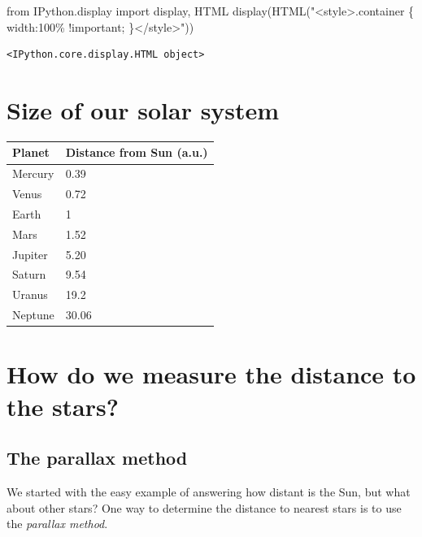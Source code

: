 \documentclass[
  letterpaper,
  DIV=11,
  numbers=noendperiod]{scrreprt}
\newenvironment{Shaded}{\begin{snugshade}}{\end{snugshade}}
\newcommand{\ImportTok}[1]{\textcolor[rgb]{0.00,0.46,0.62}{#1}}
\newcommand{\NormalTok}[1]{\textcolor[rgb]{0.00,0.23,0.31}{#1}}
\newcommand{\StringTok}[1]{\textcolor[rgb]{0.13,0.47,0.30}{#1}}
\begin{document}
\begin{Shaded}
\begin{Highlighting}[]
\ImportTok{from}\NormalTok{ IPython.display }\ImportTok{import}\NormalTok{ display, HTML}
\NormalTok{display(HTML(}\StringTok{"\textless{}style\textgreater{}.container \{ width:100\% !important; \}\textless{}/style\textgreater{}"}\NormalTok{))}
\end{Highlighting}
\end{Shaded}

\begin{verbatim}
<IPython.core.display.HTML object>
\end{verbatim}

\hypertarget{size-of-our-solar-system}{%
\section{Size of our solar system}\label{size-of-our-solar-system}}

\begin{longtable}[]{@{}ll@{}}
\toprule\noalign{}
Planet & Distance from Sun (a.u.) \\
\midrule\noalign{}
\endhead
\bottomrule\noalign{}
\endlastfoot
Mercury & 0.39 \\
Venus & 0.72 \\
Earth & 1 \\
Mars & 1.52 \\
Jupiter & 5.20 \\
Saturn & 9.54 \\
Uranus & 19.2 \\
Neptune & 30.06 \\
\end{longtable}

\hypertarget{how-do-we-measure-the-distance-to-the-stars}{%
\section{How do we measure the distance to the
stars?}\label{how-do-we-measure-the-distance-to-the-stars}}

\hypertarget{the-parallax-method}{%
\subsection{The parallax method}\label{the-parallax-method}}

We started with the easy example of answering how distant is the Sun,
but what about other stars? One way to determine the distance to nearest
stars is to use the \emph{parallax method}.
\end{document}
